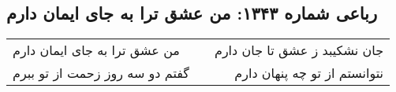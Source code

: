 \begin{center}
\section*{رباعی شماره ۱۳۴۳: من عشق ترا به جای ایمان دارم}
\label{sec:1343}
\begin{longtable}{l p{0.5cm} r}
من عشق ترا به جای ایمان دارم
&&
جان نشکیبد ز عشق تا جان دارم
\\
گفتم دو سه روز زحمت از تو ببرم
&&
نتوانستم از تو چه پنهان دارم
\\
\end{longtable}
\end{center}
